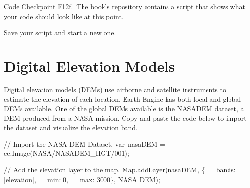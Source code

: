 \documentclass[
  letterpaper,
  DIV=11,
  numbers=noendperiod]{scrreprt}
\newenvironment{Shaded}{\begin{snugshade}}{\end{snugshade}}
\newcommand{\BuiltInTok}[1]{\textcolor[rgb]{0.00,0.23,0.31}{#1}}
\newcommand{\CommentTok}[1]{\textcolor[rgb]{0.37,0.37,0.37}{#1}}
\newcommand{\DataTypeTok}[1]{\textcolor[rgb]{0.68,0.00,0.00}{#1}}
\newcommand{\DecValTok}[1]{\textcolor[rgb]{0.68,0.00,0.00}{#1}}
\newcommand{\FunctionTok}[1]{\textcolor[rgb]{0.28,0.35,0.67}{#1}}
\newcommand{\NormalTok}[1]{\textcolor[rgb]{0.00,0.23,0.31}{#1}}
\newcommand{\OperatorTok}[1]{\textcolor[rgb]{0.37,0.37,0.37}{#1}}
\newcommand{\StringTok}[1]{\textcolor[rgb]{0.13,0.47,0.30}{#1}}
\begin{document}
\begin{tcolorbox}[enhanced jigsaw, left=2mm, breakable, rightrule=.15mm, opacityback=0, colframe=quarto-callout-note-color-frame, colbacktitle=quarto-callout-note-color!10!white, arc=.35mm, opacitybacktitle=0.6, toptitle=1mm, colback=white, leftrule=.75mm, title=\textcolor{quarto-callout-note-color}{\faInfo}\hspace{0.5em}{Note}, toprule=.15mm, bottomtitle=1mm, titlerule=0mm, bottomrule=.15mm, coltitle=black]

Code Checkpoint F12f.~The book's repository contains a script that shows
what your code should look like at this point.

\end{tcolorbox}

Save your script and start a new one.

\hypertarget{digital-elevation-models}{%
\section{Digital Elevation Models}\label{digital-elevation-models}}

Digital elevation models (DEMs) use airborne and satellite instruments
to estimate the elevation of each location. Earth Engine has both local
and global DEMs available. One of the global DEMs available is the
NASADEM dataset, a DEM produced from a NASA mission. Copy and paste the
code below to import the dataset and visualize the elevation band.

\begin{Shaded}
\begin{Highlighting}[]
\CommentTok{// Import the NASA DEM Dataset.  }
\NormalTok{var nasaDEM }\OperatorTok{=}\NormalTok{ ee}\OperatorTok{.}\FunctionTok{Image}\NormalTok{(}\StringTok{\textquotesingle{}NASA/NASADEM\_HGT/001\textquotesingle{}}\NormalTok{)}\OperatorTok{;}  
  
\CommentTok{// Add the elevation layer to the map.  }
\BuiltInTok{Map}\OperatorTok{.}\FunctionTok{addLayer}\NormalTok{(nasaDEM}\OperatorTok{,}\NormalTok{ \{  }
  \DataTypeTok{ bands}\OperatorTok{:}\NormalTok{ [}\StringTok{\textquotesingle{}elevation\textquotesingle{}}\NormalTok{]}\OperatorTok{,}  
  \DataTypeTok{ min}\OperatorTok{:} \DecValTok{0}\OperatorTok{,}  
  \DataTypeTok{ max}\OperatorTok{:} \DecValTok{3000}\NormalTok{\}}\OperatorTok{,} \StringTok{\textquotesingle{}NASA DEM\textquotesingle{}}\NormalTok{)}\OperatorTok{;}
\end{Highlighting}
\end{Shaded}
\end{document}
